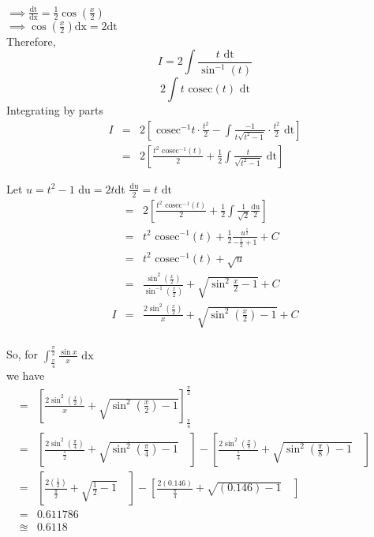 \documentclass[12pt]{report}
\newcommand{\cosec}{\text{ cosec}}
\newcommand{\sps}{\\[0.2cm]}
\newcommand{\spn}[1]{\\[#1cm]}
\newcommand{\dsp}{\displaystyle}
\newcommand{\NI}{\noindent}
\begin{document}
	$\dsp \implies \frac{\text{dt}}{\text{dx}} = \frac{1}{2}\cos(\frac{x}{2})$\spn{-.2}
	
	$\dsp \implies \cos(\frac{x}{2})\text{dx} = 2\text{dt} $\sps
	
	Therefore,\\
	$$
		I = 2 \int\frac{t\text{ dt}}{\sin^{-1}(t)}
	$$
	$$
		2\int t\text{ cosec}(t)\text{ dt}
	$$
	Integrating by parts\\
	\begin{eqnarray*}
		I &=& 2 \left[\cosec^{-1}t \cdot \frac{t^2}{2} - \int\frac{-1}{t\sqrt{t^2-1}}\cdot \frac{t^2}{2}\text{ dt}\right]\spn{0.5}
		&=& 2\left[\frac{t^2\cosec^{-1}(t)}{2} + \frac{1}{2}\int\frac{t}{\sqrt{t^2-1}}\text{ dt}\right]
	\end{eqnarray*}

	\NI Let $u = t^2 - 1$ du$ = 2t$dt $\frac{\text{du}}{2} = t\text{ dt}$\\
	\begin{eqnarray*}
		&=& 2\left[\frac{t^2\cosec^{-1}(t)}{2} + \frac{1}{2}\int\frac{1}{\sqrt{2}}\frac{\text{du}}{2}\right]\quad\spn{0.5}
		&=& t^2\cosec^{-1}(t) + \frac{1}{2} \frac{u^{\frac{1}{2}}}{-\frac{1}{2} + 1} + C\quad\spn{0.5}
		&=& t^2\cosec^{-1}(t) + \sqrt{u}\qquad\qquad\spn{0.5}
		&=& \frac{\sin^{2}(\frac{x}{2})}{\sin^{-1}(\frac{x}{2})} + \sqrt{\sin^2 \frac{x}{2}-1} + C \spn{0.5}
		I&=& \frac{2\sin^{2}(\frac{x}{2})}{x} + \sqrt{\sin^2 \left(\frac{x}{2}\right)-1} + C
	\end{eqnarray*}
	\\So, for $\dsp \int_{\frac{\pi}{4}}^{\frac{\pi}{2}}\frac{\sin x}{x} \text{ dx}$\\
	we have
	\begin{eqnarray*}
		&=& \left[\frac{2\sin^2(\frac{x}{2})}{x} + \sqrt{\sin^2(\frac{x}{2})-1}\right]_{\frac{\pi}{4}}^{\frac{\pi}{2}}\qquad\qquad\qquad\qquad\qquad\qquad\qquad\qquad\qquad\qquad\spn{0.5} 
		&=& \left[\frac{2\sin^2(\frac{\pi}{4})}{\frac{\pi}{2}} + \sqrt{\sin^2(\frac{\pi}{4})-1} \quad \right] - \left[\frac{2\sin^2(\frac{\pi}{8})}{\frac{\pi}{4}} + \sqrt{\sin^2(\frac{\pi}{8})-1} \quad \right]\spn{0.5}
		&=& \left[\frac{2(\frac{1}{2})}{\frac{\pi}{2}} + \sqrt{\frac{1}{2}-1} \quad \right] - \left[\frac{2(0.146)}{\frac{\pi}{4}} + \sqrt{(0.146)-1} \quad \right]\spn{0.3}	
		&=& 0.611786\spn{-0.3}
		&\approxeq& \mathbf{0.6118}	
	\end{eqnarray*}
	
\end{document}
